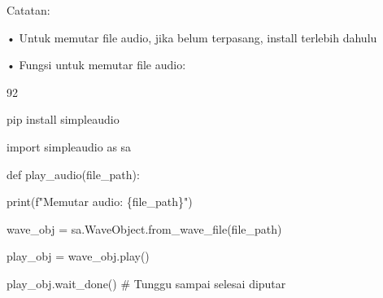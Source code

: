 \documentclass{article}
\begin{document}

Catatan:

• Untuk memutar file audio, jika belum terpasang, install terlebih dahulu

• Fungsi untuk memutar file audio:

92

pip install simpleaudio

import simpleaudio as sa

def play\_audio(file\_path):

    print(f"Memutar audio: \{file\_path\}")

    wave\_obj = sa.WaveObject.from\_wave\_file(file\_path)

    play\_obj = wave\_obj.play()

    play\_obj.wait\_done()  \# Tunggu sampai selesai diputar
\end{document}
